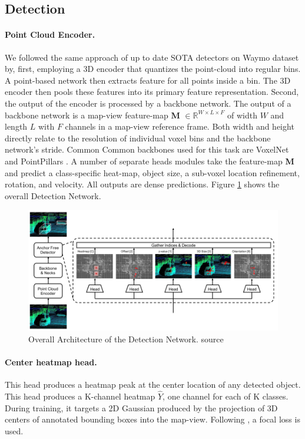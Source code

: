 \documentclass[10pt,twocolumn,letterpaper]{article}
\begin{document}
\subsection{Detection}

\paragraph{Point Cloud Encoder.} We followed the same approach of up to date SOTA detectors \cite{shi2020pv, wang20201st, yin2020center} on Waymo dataset \cite{sun2020scalability} by, first, employing a 3D encoder that quantizes the point-cloud into regular bins. A point-based network then extracts feature for all points inside a bin. The 3D encoder then pools these features into its primary feature representation. Second, the output of the encoder is processed by a backbone network. The output of a backbone network is a map-view feature-map  \textbf{M}  $ \in \mathbb{R}^{W \times L\times F}$ of width $W$ and length $L$ with $F$ channels in a map-view reference frame. Both width and height directly relate to the resolution of individual voxel bins and the backbone network’s stride. Common Common backbones used for this task are VoxelNet \cite{yan2018second, yang2018pixor} and PointPillars \cite{lang2019pointpillars}. A number of separate heads modules take the feature-map \textbf{M} and predict a class-specific heat-map, object size, a sub-voxel location refinement, rotation, and velocity. All outputs are dense predictions. Figure \ref{fig:detection_network} shows the overall Detection Network.

\begin{figure}
	\includegraphics[width=\linewidth]{media/detection_net.png}
   \caption{Overall Architecture of the Detection Network. source \cite{ge2020afdet}}
\label{fig:detection_network}
\end{figure}

\paragraph{Center heatmap head.}
This head produces a heatmap peak at the center location of any detected object. This head produces a K-channel heatmap $\hat{Y}$, one channel for each of K classes. During training, it targets a 2D Gaussian produced by the projection of 3D centers of annotated bounding boxes into the map-view. Following \cite{zhou2019objects}, a focal loss is used.
\end{document}
